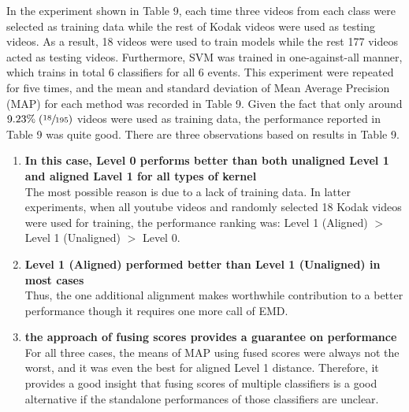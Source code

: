 \noindent In the experiment shown in Table 9, each time three videos from each class were selected as training data while the rest of Kodak videos were used as testing videos. As a result, 18 videos were used to train models while the rest 177 videos acted as testing videos. Furthermore, SVM was trained in one-against-all manner, which trains in total 6 classifiers for all 6 events. This experiment were repeated for five times, and the mean and standard deviation of Mean Average Precision (MAP) for each method was recorded in Table 9. Given the fact that only around $9.23\% \; (\sfrac{18}{195})$ videos were used as training data, the performance reported in Table 9 was quite good. There are three observations based on results in Table 9. 
\begin{enumerate}
  \item{\bf In this case, Level 0 performs better than both unaligned Level 1 and aligned Lavel 1 for all types of kernel} \\
  The most possible reason is due to a lack of training data. In latter experiments, when all youtube videos and randomly selected 18 Kodak videos were used for training, the performance ranking was: Level 1 (Aligned) $>$ Level 1 (Unaligned) $>$ Level 0. 

  \item{\bf Level 1 (Aligned) performed better than Level 1 (Unaligned) in most cases}\\
  Thus, the one additional alignment makes worthwhile contribution to a better performance though it requires one more call of EMD. 

  \item{\bf the approach of fusing scores provides a guarantee on performance}\\
  For all three cases, the means of MAP using fused scores were always not the worst, and it was even the best for aligned Level 1 distance. Therefore, it provides a good insight that fusing scores of multiple classifiers is a good alternative if the standalone performances of those classifiers are unclear.

\end{enumerate}

